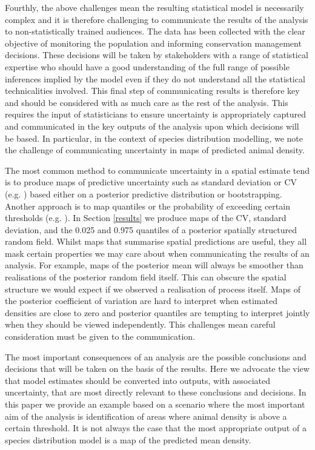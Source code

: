 \documentclass[preprint,12pt]{elsarticle}
\begin{document}
Fourthly, the above challenges mean the resulting statistical model is necessarily complex and it is therefore challenging to communicate the results of the analysis to non-statistically trained audiences.  The data has been collected with the clear objective of monitoring the population and informing conservation management decisions.  These decisions will be taken by stakeholders with a range of statistical expertise who should have a good understanding of the full range of possible inferences implied by the model even if they do not understand all the statistical technicalities involved.  This final step of communicating results is therefore key and should be considered with as much care as the rest of the analysis.  This requires the input of statisticians to ensure uncertainty is appropriately captured and communicated in the key outputs of the analysis upon which decisions will be based.  In particular, in the context of species distribution modelling, we note the challenge of communicating uncertainty in maps of predicted animal density.

The most common method to communicate uncertainty in a spatial estimate tend is to produce maps of predictive uncertainty such as standard deviation or CV (e.g. \cite{ fuller_novel_2018, vallejo_responses_2017,bradbury_mapping_2014}) based either on a posterior predictive distribution or bootstrapping.  Another approach is to map quantiles or the probability of exceeding certain thresholds (e.g. \cite{russell_avoidance_2016, wilson_hierarchical_2010}).  In Section \ref{results} we produce maps of the CV, standard deviation, and the 0.025 and 0.975 quantiles of a posterior spatially structured random field.  Whilst maps that summarise spatial predictions are useful, they all mask certain properties we may care about when communicating the results of an analysis.  For example, maps of the posterior mean will always be smoother than realisations of the posterior random field itself.  This can obscure the spatial structure we would expect if we observed a realisation of process itself.  Maps of the posterior coefficient of variation are hard to interpret when estimated densities are close to zero and posterior quantiles are tempting to interpret jointly when they should be viewed independently.  This challenges mean careful consideration must be given to the communication. 

The most important consequences of an analysis are the possible conclusions and decisions that will be taken on the basis of the results.  Here we advocate the view that model estimates should be converted into outputs, with associated uncertainty, that are most directly relevant to these conclusions and decisions.  In this paper we provide an example based on a scenario where the most important aim of the analysis is identification of areas where animal density is above a certain threshold.  It is not always the case that the most appropriate output of a species distribution model is a map of the predicted mean density.        
\end{document}
